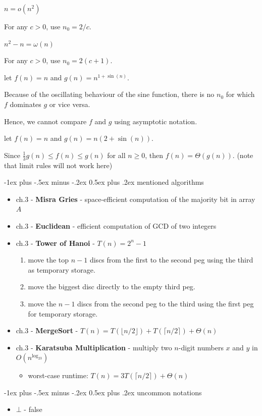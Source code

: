 \documentclass[10pt, landscape]{article}
\makeatletter
\renewcommand{\section}{\@startsection{section}{1}{0mm}%
  {-1ex plus -.5ex minus -.2ex}%
  {0.5ex plus .2ex}%
{\normalfont\large\bfseries}}
\makeatother
\begin{document}
\begin{niceproof}
  $n=o(n^2)$ 

  For any $c>0$, use $n_0 = 2/c$.
\end{niceproof}

\begin{niceproof}
  $n^2 - n =\omega(n)$ 

  For any $c>0$, use $n_0 = 2(c+1)$.
\end{niceproof}

\begin{niceproof}[Example]
  let $f(n) = n$ and $g(n) = n^{1 + \sin (n)}$. 

  Because of the oscillating behaviour of the sine function, there is no $n_0$ for which $f$ dominates $g$ or vice versa.

  Hence, we cannot compare $f$ and $g$ using asymptotic notation.
\end{niceproof}

\begin{niceproof}[Example]
  let $f(n) = n$ and $g(n) = n(2+\sin(n))$.

  Since $\frac{1}{3}g(n) \leq f(n) \leq g(n)$ for all $n \geq 0$, then $f(n) = \Theta(g(n))$.
  (note that limit rules will not work here)
\end{niceproof}

\section{mentioned algorithms}

\begin{itemize}
  \item ch.3 - \textbf{Misra Gries} - space-efficient computation of the majority bit in array $A$
  \item ch.3 - \textbf{Euclidean} - efficient computation of GCD of two integers
  \item ch.3 - \textbf{Tower of Hanoi} - $T(n) = 2^n-1$
    \begin{enumerate}
      \item move the top $n-1$ discs from the first to the second peg using the third as temporary storage. 
      \item move the biggest disc directly to the empty third peg.
      \item move the $n-1$ discs from the second peg to the third using the first peg for temporary storage.
    \end{enumerate}
  \item ch.3 - \textbf{MergeSort} - $T(n) = T(\lfloor n/2 \rfloor) + T(\lceil n/2 \rceil) + \Theta(n)$
  \item ch.3 - \textbf{Karatsuba Multiplication} - multiply two $n$-digit numbers $x$ and $y$ in $O(n^{\log_23})$
    \begin{itemize}
      \item worst-case runtime: $T(n) = 3T( \lceil n/2 \rceil ) + \Theta(n) $
    \end{itemize}
\end{itemize}

\section{uncommon notations}

\begin{itemize}
  \item $\bot$ - false
\end{itemize}
\end{document}
